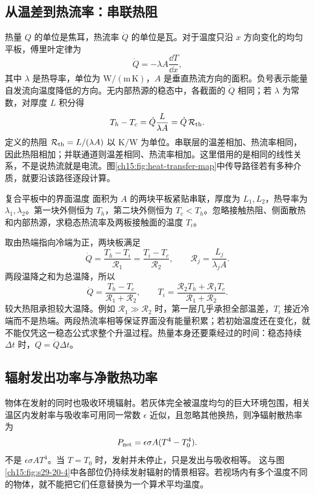 \subsection{从温差到热流率：串联热阻}
热量 $Q$ 的单位是焦耳，热流率 $\dot Q$ 的单位是瓦。对于温度只沿 $x$ 方向变化的均匀平板，傅里叶定律为
\[
 \dot Q=-\lambda A\frac{\dd T}{\dd x},
\]
其中 $\lambda$ 是热导率，单位为 $\mathrm{W/(m\,K)}$，$A$ 是垂直热流方向的面积。负号表示能量自发流向温度降低的方向。无内部热源的稳态中，各截面的 $\dot Q$ 相同；若 $\lambda$ 为常数，对厚度 $L$ 积分得
\[
 T_h-T_c=\dot Q\frac{L}{\lambda A}=\dot Q\,\mathcal R_{\rm th}.
\]
定义的热阻 $\mathcal R_{\rm th}=L/(\lambda A)$ 以 $\mathrm{K/W}$ 为单位。串联层的温差相加、热流率相同，因此热阻相加；并联通道则温差相同、热流率相加。这里借用的是相同的线性关系，不是说热流就是电流。图\ref{ch15:fig:heat-transfer-map}中传导路径若有多种介质，就要沿该路径逐段计算。

\begin{origexamplebox}{复合平板中的界面温度}\label{ch15:ex:teaching-conduction}
面积为 $A$ 的两块平板紧贴串联，厚度为 $L_1,L_2$，热导率为 $\lambda_1,\lambda_2$。第一块外侧恒为 $T_h$，第二块外侧恒为 $T_c<T_h$。忽略接触热阻、侧面散热和内部热源，求稳态热流率及两板接触面的温度 $T_i$。
\end{origexamplebox}
\begin{xesolution}
取由热端指向冷端为正，两块板满足
\[
 \dot Q=\frac{T_h-T_i}{\mathcal R_1}
       =\frac{T_i-T_c}{\mathcal R_2},\qquad
 \mathcal R_j=\frac{L_j}{\lambda_jA}.
\]
两段温降之和为总温降，所以
\[
 \dot Q=\frac{T_h-T_c}{\mathcal R_1+\mathcal R_2},\qquad
 T_i=\frac{\mathcal R_2T_h+\mathcal R_1T_c}{\mathcal R_1+\mathcal R_2}.
\]
较大热阻承担较大温降。例如 $\mathcal R_1\gg\mathcal R_2$ 时，第一层几乎承担全部温差，$T_i$ 接近冷端而不是热端。两段热流率相等保证界面没有能量积累；若初始温度还在变化，就不能仅凭这一稳态公式求整个升温过程。热量本身还要乘经过的时间：稳态持续 $\Delta t$ 时，$Q=\dot Q\Delta t$。
\end{xesolution}

\subsection{辐射发出功率与净散热功率}
物体在发射的同时也吸收环境辐射。若灰体完全被温度均匀的巨大环境包围，相关温区内发射率与吸收率可用同一常数 $\epsilon$ 近似，且忽略其他换热，则净辐射散热率为
\[
 P_{\rm net}=\epsilon\sigma A(T^4-T_0^4).
\]
不是 $\epsilon\sigma AT^4$。当 $T=T_0$ 时，发射并未停止，只是发出与吸收相等。
这与图\ref{ch15:fig:s29-20-4}中各部位仍持续发射辐射的情景相容。若视场内有多个温度不同的物体，就不能把它们任意替换为一个算术平均温度。

